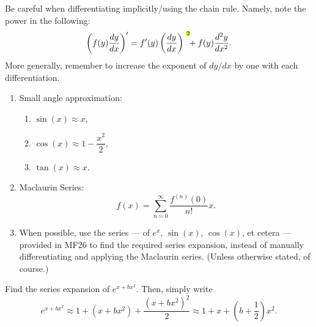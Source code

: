 \begin{note}
  Be careful when differentiating implicitly/using the chain rule. Namely, note the power  in the following:
  \[\left( f(y)\frac{dy}{dx} \right)'=f'(y)\left( \frac{dy}{dx} \right)^{\highlight[yellow]{2}}+f(y)\frac{d^2y}{dx^2}.\]
  More generally, remember to increase the exponent of \(dy/dx\) by one with each differentiation.
\end{note}
\begin{stbox}{}
  \begin{enumerate}
    \item Small angle approximation: 
    \begin{enumerate}
      \item \(\sin(x) \approx x\),
      \item \(\cos(x) \approx 1-\dfrac{x^2}{2}\),
      \item \(\tan(x) \approx x\).
    \end{enumerate}
    \item Maclaurin Series: 
    \[f(x)=\sum_{n=0}^{\infty}\dfrac{f^{(n)}(0)}{n!}x.\]
    \item When possible, use the series --- of \(e^{x}\), \(\sin(x)\), \(\cos(x)\), et cetera --- provided in MF26 to find the required series expansion, instead of manually differentiating and applying the Maclaurin series. (Unless otherwise stated, of course.)  
  \end{enumerate}
  \begin{example*}{}{}
    Find the series expansion of \(e^{x+bx^2}\). Then, simply write
    \[e^{x+bx^2}\approx 1+(x+bx^2)+\frac{(x+bx^2)^2}{2}\approx 1+x+\left( b+\frac{1}{2} \right)x^2.\]
  \end{example*}
\end{stbox}